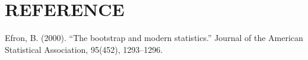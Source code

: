\documentclass[
  letterpaper,
  toc=chapterentrywithdots,
  listof=totoc,
  11pt,
  headings=small,
  usegeometry]{scrreprt}
\newlength{\cslhangindent}
\newenvironment{CSLReferences}[2] %
 {\begin{list}{}{%
  \setlength{\itemindent}{0pt}
  \setlength{\leftmargin}{0pt}
  \setlength{\parsep}{0pt}
  \ifodd #1
   \setlength{\leftmargin}{\cslhangindent}
   \setlength{\itemindent}{-1\cslhangindent}
  \fi
  \setlength{\itemsep}{#2\baselineskip}}}
 {\end{list}}
\begin{document}

\chapter{REFERENCE}\label{reference}

\protect{}\label{refs}
\begin{CSLReferences}{1}{0}
Efron, B. (2000). {``The bootstrap and modern statistics.''} Journal of
the American Statistical Association, 95(452), 1293--1296.

\end{CSLReferences}
\end{document}
